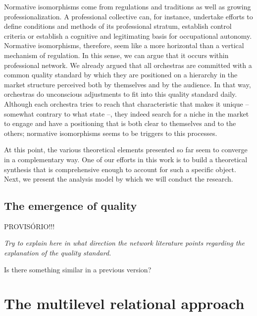 \documentclass[a4paper, 12pt, openright, oneside, german, french, brazil, english]{abntex2}
\begin{document}
	Normative isomorphisms come from regulations and traditions as well as growing professionalization. A professional collective can, for instance, undertake efforts to define conditions and methods of its professional stratum, establish control criteria or establish a cognitive and legitimating basis for occupational autonomy. Normative isomorphisms, therefore, seem like a more horizontal than a vertical mechanism of regulation. In this sense, we can argue that it occurs within professional network. We already argued that all orchestras are committed with a common quality standard by which they are positioned on a hierarchy in the market structure perceived both by themselves and by the audience. In that way, orchestras do unconscious adjustments to fit into this quality standard daily. Although each orchestra tries to reach that characteristic that makes it unique -- somewhat contrary to what  state --, they indeed search for a niche in the market to engage and have a positioning that is both clear to themselves and to the others; normative isomorphisms seems to be triggers to this processes.
	
	
	
	At this point, the various theoretical elements presented so far seem to converge in a complementary way. One of our efforts in this work is to build a theoretical synthesis that is comprehensive enough to account for such a specific object. Next, we present the analysis model by which we will conduct the research.


        \section{The emergence of quality}

        PROVISÓRIO!!!

        \textit{Try to explain here in what direction the network literature points regarding the explanation of the quality standard.}

        Is there something similar in a previous version?

        \chapter{The multilevel relational approach}
	
\end{document}
